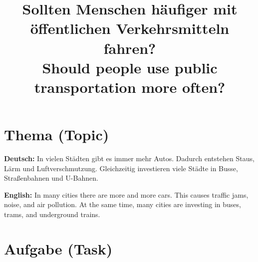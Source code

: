 \documentclass[a4paper,11pt]{article}
\title{Sollten Menschen häufiger mit öffentlichen Verkehrsmitteln fahren?\\[0.35em]
\large \textnormal{Should people use public transportation more often?}}
\date{}
\newcommand{\GermanText}[1]{\textbf{Deutsch: }#1\par}
\newcommand{\EnglishText}[1]{{\small\color{SoftGray}\textbf{English: }#1\par}}
\begin{document}
   \maketitle

   \section{Thema \textnormal{(Topic)}}

      \begin{taskbox}
         \GermanText{In vielen Städten gibt es immer mehr Autos. Dadurch entstehen Staus, Lärm und Luftverschmutzung. Gleichzeitig investieren viele Städte in Busse, Straßenbahnen und U-Bahnen.}
         \EnglishText{In many cities there are more and more cars. This causes traffic jams, noise, and air pollution. At the same time, many cities are investing in buses, trams, and underground trains.}
      \end{taskbox}

   \section{Aufgabe \textnormal{(Task)}}
\end{document}

